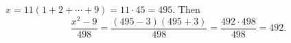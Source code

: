 $x=11(1+2+\cdots+9)=11\cdot45=495$. Then
\[\dfrac{x^2-9}{498}=\dfrac{(495-3)(495+3)}{498}=\dfrac{492\cdot498}{498}=\boxed{492}.\]
